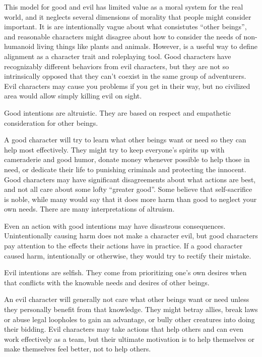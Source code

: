         This model for good and evil has limited value as a moral system for the real world, and it neglects several dimensions of morality that people might consider important.
        It is are intentionally vague about what consistutes ``other beings'', and reasonable characters might disagree about how to consider the needs of non-humanoid living things like plants and animals.
        However, is a useful way to define alignment as a character trait and roleplaying tool.
        Good characters have recognizably different behaviors from evil characters, but they are not so intrinsically opposed that they can't coexist in the same group of adventurers.
        Evil characters may cause you problems if you get in their way, but no civilized area would allow simply killing evil on sight.

         Good intentions are altruistic.
        They are based on respect and empathetic consideration for other beings.

        A good character will try to learn what other beings want or need so they can help most effectively.
        They might try to keep everyone's spirits up with cameraderie and good humor, donate money whenever possible to help those in need, or dedicate their life to punishing criminals and protecting the innocent.
        Good characters may have significant disagreements about what actions are best, and not all care about some lofty ``greater good''.
        Some believe that self-sacrifice is noble, while many would say that it does more harm than good to neglect your own needs.
        There are many interpretations of altruism.

        Even an action with good intentions may have disastrous consequences.
        Unintentionally causing harm does not make a character evil, but good characters pay attention to the effects their actions have in practice.
        If a good character caused harm, intentionally or otherwise, they would try to rectify their mistake.

         Evil intentions are selfish.
        They come from prioritizing one's own desires when that conflicts with the knowable needs and desires of other beings.

        An evil character will generally not care what other beings want or need unless they personally benefit from that knowledge.
        They might betray allies, break laws or abuse legal loopholes to gain an advantage, or bully other creatures into doing their bidding.
        Evil characters may take actions that help others and can even work effectively as a team, but their ultimate motivation is to help themselves or make themselves feel better, not to help others.

